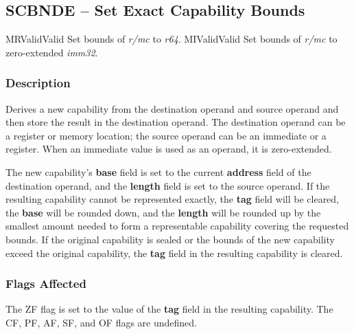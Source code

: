 \clearpage
{}
{}
\subsection*{SCBNDE -- Set Exact Capability Bounds}

\begin{x86opcodetable}
  {MR}{Valid}{Valid}
  {Set bounds of \emph{r/mc} to \emph{r64}.}
  {MI}{Valid}{Valid}
  {Set bounds of \emph{r/mc} to zero-extended \emph{imm32}.}
\end{x86opcodetable}

\begin{x86opentable}
\end{x86opentable}

\subsubsection*{Description}

Derives a new capability from the destination operand and source
operand and then store the result in the destination operand.  The
destination operand can be a register or memory location; the source
operand can be an immediate or a register.  When an immediate value is
used as an operand, it is zero-extended.

The new capability's \textbf{base} field is set to the current
\textbf{address} field of the destination operand, and the
\textbf{length} field is set to the source operand.  If the resulting
capability cannot be represented exactly, the \textbf{tag} field will
be cleared, the \textbf{base} will be rounded down, and the
\textbf{length} will be rounded up by the smallest amount needed to
form a representable capability covering the requested bounds.  If the
original capability is sealed or the bounds of the new capability
exceed the original capability, the \textbf{tag} field in the
resulting capability is cleared.

\subsubsection*{Flags Affected}

The ZF flag is set to the value of the \textbf{tag} field in the
resulting capability.  The CF, PF, AF, SF, and OF flags are undefined.
